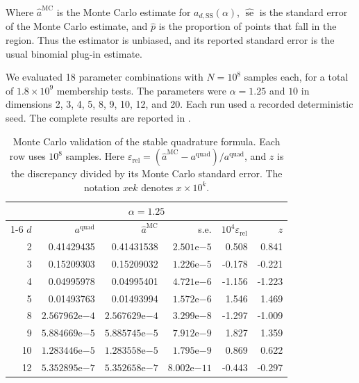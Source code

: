 \documentclass[a4paper,fleqn]{cas-dc}
\theoremstyle{definition}
\theoremstyle{remark}
\newcommand{\0}{\mathbf{0}}
\begin{document}
Where \(\widehat a^{\mathrm{MC}}\) is the Monte Carlo estimate for
\(a_{d,\mathrm{SS}}(\alpha)\),
\(\widehat{\operatorname{se}}\) is the standard error of the Monte Carlo estimate,
and \(\widehat p\) is the proportion of points that fall in the region. 
Thus the estimator is unbiased, and its reported standard error is the usual
binomial plug-in estimate.

We evaluated 18 parameter combinations with $N=10^8$ samples each, for a
total of $1.8\times10^9$ membership tests. The parameters were
$\alpha=1.25$ and $10$ in dimensions 2, 3, 4, 5, 8, 9, 10, 12, and 20.
Each run used a recorded deterministic seed. The complete results are
reported in .

\begin{table}[pos=htbp]
\centering
\caption{Monte Carlo validation of the stable quadrature formula. Each row
uses $10^8$ samples. Here
$\varepsilon_{\mathrm{rel}}=(\widehat a^{\mathrm{MC}}-a^{\mathrm{quad}})/
a^{\mathrm{quad}}$, and $z$ is the discrepancy divided by its Monte Carlo
standard error. The notation $x\mathrm{e}k$ denotes $x\times10^k$.}
\label{tab:mc-validation}
\begingroup
\scriptsize
\setlength{\tabcolsep}{2.15pt}
\renewcommand{\arraystretch}{1.08}
\begin{minipage}[t]{0.495\linewidth}
\centering
\begin{tabular}{@{}rrrrrr@{}}
\toprule
\multicolumn{6}{c}{$\alpha=1.25$}\\
\cmidrule(lr){1-6}
$d$ & $a^{\mathrm{quad}}$ & $\widehat a^{\mathrm{MC}}$ & s.e. &
$10^4\varepsilon_{\mathrm{rel}}$ & $z$\\
\midrule
 2 & 0.41429435 & 0.41431538 & $2.501\mathrm{e}{-5}$  &  0.508 &  0.841\\
 3 & 0.15209303 & 0.15209032 & $1.226\mathrm{e}{-5}$  & -0.178 & -0.221\\
 4 & 0.04995978 & 0.04995401 & $4.721\mathrm{e}{-6}$  & -1.156 & -1.223\\
 5 & 0.01493763 & 0.01493994 & $1.572\mathrm{e}{-6}$  &  1.546 &  1.469\\
 8 & $2.567962\mathrm{e}{-4}$ & $2.567629\mathrm{e}{-4}$ & $3.299\mathrm{e}{-8}$  & -1.297 & -1.009\\
 9 & $5.884669\mathrm{e}{-5}$ & $5.885745\mathrm{e}{-5}$ & $7.912\mathrm{e}{-9}$  &  1.827 &  1.359\\
10 & $1.283446\mathrm{e}{-5}$ & $1.283558\mathrm{e}{-5}$ & $1.795\mathrm{e}{-9}$  &  0.869 &  0.622\\
12 & $5.352895\mathrm{e}{-7}$ & $5.352658\mathrm{e}{-7}$ & $8.002\mathrm{e}{-11}$ & -0.443 & -0.297\\

\end{tabular}
\end{minipage}
\end{table}
\end{document}
